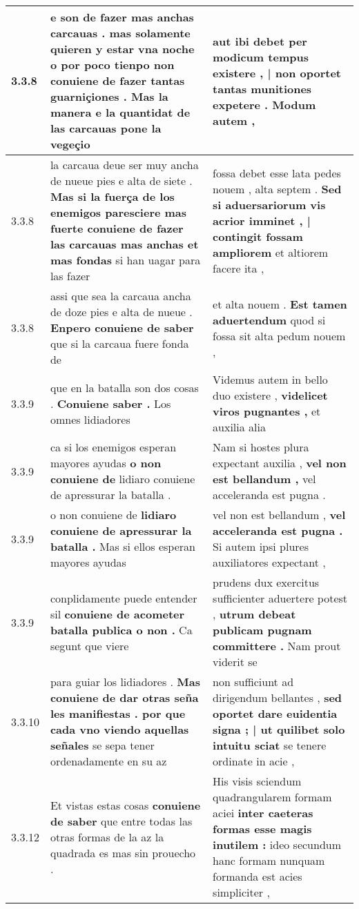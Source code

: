 \begin{tabular}{|p{1cm}|p{6.5cm}|p{6.5cm}|}
3.3.8 & e son de fazer mas anchas carcauas . \textbf{ mas solamente quieren y estar vna noche o por poco tienpo non conuiene de fazer tantas guarniçiones . } Mas la manera e la quantidat de las carcauas pone la vegeçio & aut ibi debet \textbf{ per modicum tempus existere , | non oportet tantas munitiones expetere . } Modum autem , \\\hline
3.3.8 & la carcaua deue ser muy ancha de nueue pies e alta de siete . \textbf{ Mas si la fuerça de los enemigos paresciere mas fuerte conuiene de fazer las carcauas mas anchas et mas fondas } si han uagar para las fazer & fossa debet esse lata pedes nouem , alta septem . \textbf{ Sed si aduersariorum vis acrior imminet , | contingit fossam ampliorem } et altiorem facere ita , \\\hline
3.3.8 & assi que sea la carcaua ancha de doze pies e alta de nueue . \textbf{ Enpero conuiene de saber } que si la carcaua fuere fonda de & et alta nouem . \textbf{ Est tamen aduertendum } quod si fossa sit alta pedum nouem , \\\hline
3.3.9 & que en la batalla son dos cosas . \textbf{ Conuiene saber . } Los omnes lidiadores & Videmus autem in bello duo existere , \textbf{ videlicet viros pugnantes , } et auxilia alia \\\hline
3.3.9 & ca si los enemigos esperan mayores ayudas \textbf{ o non conuiene de } lidiaro conuiene de apressurar la batalla . & Nam si hostes plura expectant auxilia , \textbf{ vel non est bellandum , } vel acceleranda est pugna . \\\hline
3.3.9 & o non conuiene de \textbf{ lidiaro conuiene de apressurar la batalla . } Mas si ellos esperan mayores ayudas & vel non est bellandum , \textbf{ vel acceleranda est pugna . } Si autem ipsi plures auxiliatores expectant , \\\hline
3.3.9 & conplidamente puede entender sil \textbf{ conuiene de acometer batalla publica o non . } Ca segunt que viere & prudens dux exercitus sufficienter aduertere potest , \textbf{ utrum debeat publicam pugnam committere . } Nam prout viderit se \\\hline
3.3.10 & para guiar los lidiadores . \textbf{ Mas conuiene de dar otras seña les manifiestas . por que cada vno viendo aquellas señales } se sepa tener ordenadamente en su az & non sufficiunt ad dirigendum bellantes , \textbf{ sed oportet dare euidentia signa ; | ut quilibet solo intuitu sciat } se tenere ordinate in acie , \\\hline
3.3.12 & Et vistas estas cosas \textbf{ conuiene de saber } que entre todas las otras formas de la az la quadrada es mas sin prouecho . & His visis sciendum quadrangularem formam aciei \textbf{ inter caeteras formas esse magis inutilem : } ideo secundum hanc formam nunquam formanda est acies simpliciter , \\\hline

\end{tabular}
